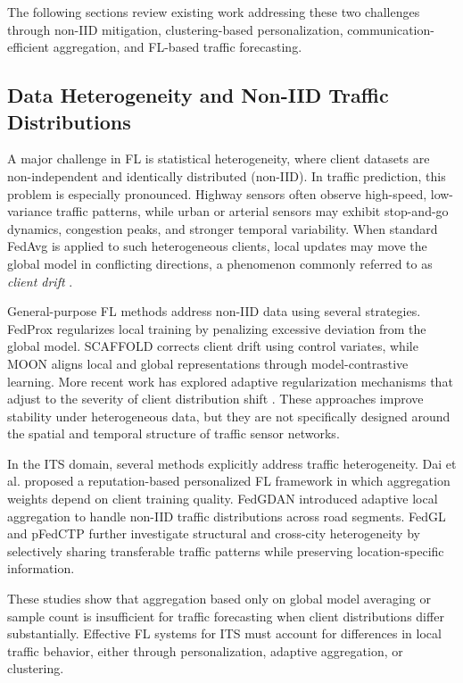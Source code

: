 The following sections review existing work addressing these two challenges through non-IID mitigation, clustering-based personalization, communication-efficient aggregation, and FL-based traffic forecasting.

\subsection{Data Heterogeneity and Non-IID Traffic Distributions}

A major challenge in FL is statistical heterogeneity, where client datasets are non-independent and identically distributed (non-IID). In traffic prediction, this problem is especially pronounced. Highway sensors often observe high-speed, low-variance traffic patterns, while urban or arterial sensors may exhibit stop-and-go dynamics, congestion peaks, and stronger temporal variability. When standard FedAvg is applied to such heterogeneous clients, local updates may move the global model in conflicting directions, a phenomenon commonly referred to as \textit{client drift} \cite{zhao2018, karimireddy2020}.

General-purpose FL methods address non-IID data using several strategies. FedProx \cite{li2020fedprox} regularizes local training by penalizing excessive deviation from the global model. SCAFFOLD \cite{karimireddy2020} corrects client drift using control variates, while MOON \cite{li2021moon} aligns local and global representations through model-contrastive learning. More recent work has explored adaptive regularization mechanisms that adjust to the severity of client distribution shift \cite{cha2025}. These approaches improve stability under heterogeneous data, but they are not specifically designed around the spatial and temporal structure of traffic sensor networks.

In the ITS domain, several methods explicitly address traffic heterogeneity. Dai et al. \cite{dai2024} proposed a reputation-based personalized FL framework in which aggregation weights depend on client training quality. FedGDAN \cite{li2025fedgdan} introduced adaptive local aggregation to handle non-IID traffic distributions across road segments. FedGL \cite{zhang2024fedgl} and pFedCTP \cite{zhang2024pfedctp} further investigate structural and cross-city heterogeneity by selectively sharing transferable traffic patterns while preserving location-specific information.

These studies show that aggregation based only on global model averaging or sample count is insufficient for traffic forecasting when client distributions differ substantially. Effective FL systems for ITS must account for differences in local traffic behavior, either through personalization, adaptive aggregation, or clustering.

